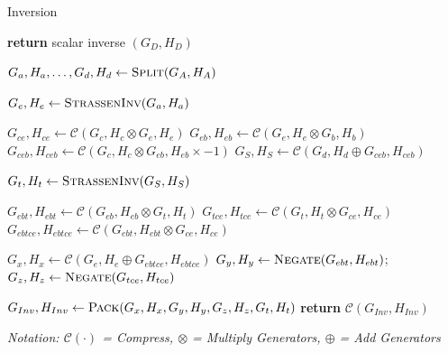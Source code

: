 \begin{frame}{Inversion} 
    \begin{algorithm}[H]
    \scriptsize %
    \caption{Strassen-type Inversion for Generators: \textsc{StrassenInv}($G_A, H_A$)}
    \begin{algorithmic}[1]
        
         \textbf{return} scalar inverse $(G_D, H_D)$ \EndIf {}
        
        \State $G_a, H_a, \dots, G_d, H_d \gets \textsc{Split}(G_A, H_A)$ 
        
        \State $G_e, H_e \gets \textsc{StrassenInv}(G_a, H_a)$ 
        
        \State $G_{ce}, H_{ce} \gets \mathcal{C}(G_c, H_c \otimes G_e, H_e)$ 
        \State $G_{eb}, H_{eb} \gets \mathcal{C}(G_e, H_e \otimes G_b, H_b)$
        \State $G_{ceb}, H_{ceb} \gets \mathcal{C}(G_c, H_c \otimes G_{eb}, H_{eb} \times -1)$
        \State $G_S, H_S \gets \mathcal{C}(G_d, H_d \oplus G_{ceb}, H_{ceb})$ 
        
        \State $G_t, H_t \gets \textsc{StrassenInv}(G_S, H_S)$ 
        
        \State $G_{ebt}, H_{ebt} \gets \mathcal{C}(G_{eb}, H_{eb} \otimes G_t, H_t)$ 
        \State $G_{tce}, H_{tce} \gets \mathcal{C}(G_t, H_t \otimes G_{ce}, H_{ce})$
        \State $G_{ebtce}, H_{ebtce} \gets \mathcal{C}(G_{ebt}, H_{ebt} \otimes G_{ce}, H_{ce})$
        
        \State $G_x, H_x \gets \mathcal{C}(G_e, H_e \oplus G_{ebtce}, H_{ebtce})$ 
        \State $G_y, H_y \gets \textsc{Negate}(G_{ebt}, H_{ebt})$; \quad $G_z, H_z \gets \textsc{Negate}(G_{tce}, H_{tce})$ 
        
        \State $G_{Inv}, H_{Inv} \gets \textsc{Pack}(G_x, H_x, G_y, H_y, G_z, H_z, G_t, H_t)$ 
        \State \textbf{return} $\mathcal{C}(G_{Inv}, H_{Inv})$
        
    \end{algorithmic}
    \end{algorithm}

    \vspace{-0.2cm}
    {\scriptsize \textit{Notation: $\mathcal{C}(\cdot)$ = Compress, $\otimes$ = Multiply Generators, $\oplus$ = Add Generators}}
    \vspace{-0.1cm}
\end{frame}